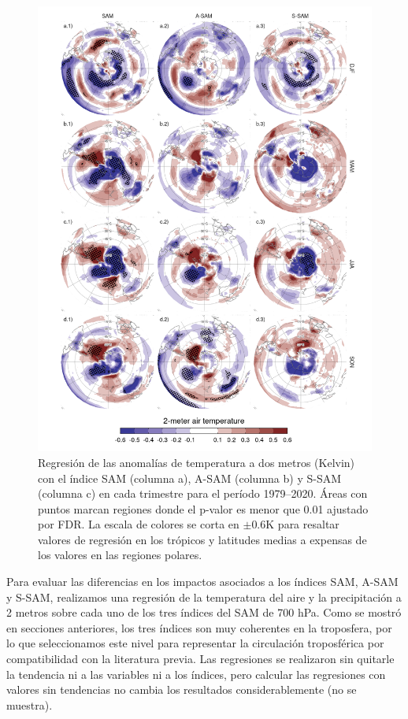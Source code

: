 \documentclass[12pt,oneside]{reedthesis}
\begin{document}
\begin{figure}
\includegraphics{figures/30-sam/regr-air-season-1} \caption{Regresión de las anomalías de temperatura a dos metros (Kelvin) con el índice SAM (columna a), A-SAM (columna b) y S-SAM (columna c) en cada trimestre para el período 1979--2020. Áreas con puntos marcan regiones donde el p-valor es menor que 0.01 ajustado por FDR. La escala de colores se corta en \(\pm0.6 \mathrm{K}\) para resaltar valores de regresión en los trópicos y latitudes medias a expensas de los valores en las regiones polares.}\label{fig:regr-air-season}
\end{figure}

Para evaluar las diferencias en los impactos asociados a los índices SAM, A-SAM y S-SAM, realizamos una regresión de la temperatura del aire y la precipitación a 2 metros sobre cada uno de los tres índices del SAM de 700 hPa.
Como se mostró en secciones anteriores, los tres índices son muy coherentes en la troposfera, por lo que seleccionamos este nivel para representar la circulación troposférica por compatibilidad con la literatura previa.
Las regresiones se realizaron sin quitarle la tendencia ni a las variables ni a los índices, pero calcular las regresiones con valores sin tendencias no cambia los resultados considerablemente (no se muestra).
\end{document}
